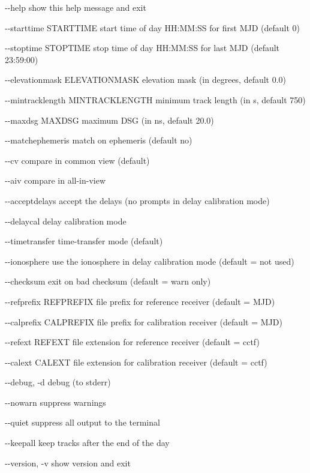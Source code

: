 \begin{description*}
 \item[-{}-help]            show this help message and exit
 \item[-{}-starttime STARTTIME] start time of day HH:MM:SS for first MJD (default 0)
 \item[-{}-stoptime STOPTIME]   stop time of day HH:MM:SS for last MJD (default 23:59:00)
 \item[-{}-elevationmask ELEVATIONMASK] elevation mask (in degrees, default 0.0)
 \item[-{}-mintracklength MINTRACKLENGTH] minimum track length (in s, default 750)
 \item[-{}-maxdsg MAXDSG]       maximum DSG (in ns, default 20.0)
 \item[-{}-matchephemeris ]     match on ephemeris (default no)
  \item[-{}-cv]                  compare in common view (default)
  \item[-{}-aiv]                 compare in all-in-view
  \item[-{}-acceptdelays]        accept the delays (no prompts in delay calibration mode)
  \item[-{}-delaycal]            delay calibration mode
  \item[-{}-timetransfer]        time-transfer mode (default)
  \item[-{}-ionosphere]          use the ionosphere in delay calibration mode (default = not used)
   \item[-{}-checksum]           exit on bad checksum (default = warn only)
  \item[-{}-refprefix REFPREFIX] file prefix for reference receiver (default = MJD)
  \item[-{}-calprefix CALPREFIX] file prefix for calibration receiver (default = MJD)
  \item[-{}-refext REFEXT]       file extension for reference receiver (default = cctf)
  \item[-{}-calext CALEXT]       file extension for calibration receiver (default = cctf)
  \item[-{}-debug, -d]           debug (to stderr)
  \item[-{}-nowarn]              suppress warnings
  \item[-{}-quiet]               suppress all output to the terminal
  \item[-{}-keepall]             keep tracks after the end of the day
  \item[-{}-version, -v]         show version and exit
\end{description*}

